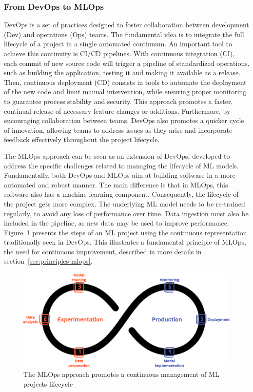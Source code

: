\documentclass[graybox]{svmult}
\begin{document}
\subsubsection{From DevOps to MLOps}
\label{subsubsec:devops-mlops}

DevOps is a set of practices designed to foster collaboration between development (Dev) and operations (Ops) teams. The fundamental idea is to integrate the full lifecycle of a project in a single automated continuum. An important tool to achieve this continuity is CI/CD pipelines. With continuous integration (CI), each commit of new source code will trigger a pipeline of standardized operations, such as building the application, testing it and making it available as a release. Then, continuous deployment (CD) consists in tools to automate the deployment of the new code and limit manual intervention, while ensuring proper monitoring to guarantee process stability and security. This approach promotes a faster, continual release of necessary feature changes or additions. Furthermore, by encouraging collaboration between teams, DevOps also promotes a quicker cycle of innovation, allowing teams to address issues as they arise and incorporate feedback effectively throughout the project lifecycle.

The MLOps approach can be seen as an extension of DevOps, developed to address the specific challenges related to managing the lifecycle of ML models. Fundamentally, both DevOps and MLOps aim at building software in a more automated and robust manner. The main difference is that in MLOps, this software also has a machine learning component. Consequently, the lifecycle of the project gets more complex. The underlying ML model needs to be re-trained regularly, to avoid any loss of performance over time. Data ingestion must also be included in the pipeline, as new data may be used to improve performance. Figure~\ref{fig:mlops-cycle} presents the steps of an ML project using the continuous representation traditionally seen in DevOps. This illustrates a fundamental principle of MLOps, the need for continuous improvement, described in more details in section~\ref{sec:principles-mlops}.

\begin{figure}[htbp]
    \centering
    \includegraphics[width=\textwidth]{figures/mlops-cycle.png}
    \caption{The MLOps approach promotes a continuous management of ML projects lifecycle}
    \label{fig:mlops-cycle}
\end{figure}
\end{document}
